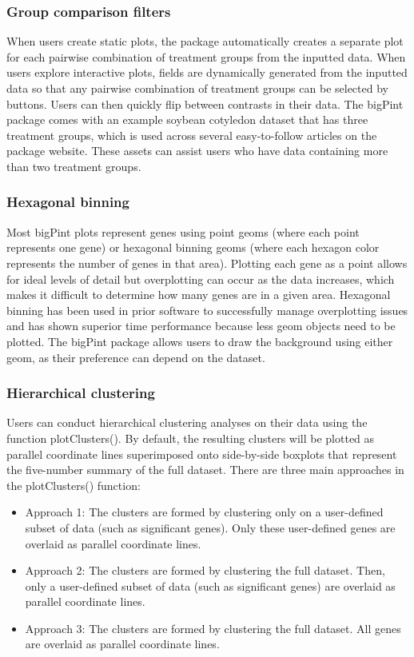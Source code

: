 \documentclass[parskip=full]{bmcart}
\begin{document}
\subsubsection*{Group comparison filters}

When users create static plots, the package automatically creates a separate plot for each pairwise combination of treatment groups from the inputted data. When users explore interactive plots, fields are dynamically generated from the inputted data so that any pairwise combination of treatment groups can be selected by buttons. Users can then quickly flip between contrasts in their data. The bigPint package comes with an example soybean cotyledon dataset that has three treatment groups, which is used across several easy-to-follow articles on the package website. These assets can assist users who have data containing more than two treatment groups. 

\subsubsection*{Hexagonal binning}

Most bigPint plots represent genes using point geoms (where each point represents one gene) or hexagonal binning geoms (where each hexagon color represents the number of genes in that area). Plotting each gene as a point allows for ideal levels of detail but overplotting can occur as the data increases, which makes it difficult to determine how many genes are in a given area. Hexagonal binning has been used in prior software to successfully manage overplotting issues \cite{carr1987scatterplot, harshbarger2017deiva} and has shown superior time performance because less geom objects need to be plotted. The bigPint package allows users to draw the background using either geom, as their preference can depend on the dataset.

\subsubsection*{Hierarchical clustering}

Users can conduct hierarchical clustering analyses on their data using the function plotClusters(). By default, the resulting clusters will be plotted as parallel coordinate lines superimposed onto side-by-side boxplots that represent the five-number summary of the full dataset. There are three main approaches in the plotClusters() function:

\begin{itemize}  
\item Approach 1: The clusters are formed by clustering only on a user-defined subset of data (such as significant genes). Only these user-defined genes are overlaid as parallel coordinate lines. 
\item Approach 2: The clusters are formed by clustering the full dataset. Then, only a user-defined subset of data (such as significant genes) are overlaid as parallel coordinate lines.
\item Approach 3: The clusters are formed by clustering the full dataset. All genes are overlaid as parallel coordinate lines.
\end{itemize}
\end{document}
